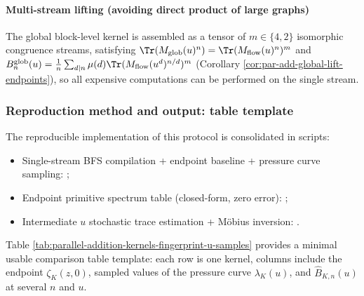 \paragraph{Multi-stream lifting (avoiding direct product of large graphs)}
The global block-level kernel is assembled as a tensor of $m\in\{4,2\}$ isomorphic congruence streams, satisfying
\(
\Tr(M_{\mathrm{glob}}(u)^n)=\Tr(M_{\mathrm{flow}}(u)^n)^m
\)
and
\(
B_n^{\mathrm{glob}}(u)=\frac1n\sum_{d\mid n}\mu(d)\Tr(M_{\mathrm{flow}}(u^d)^{n/d})^m
\)
(Corollary \ref{cor:par-add-global-lift-endpoints}), so all expensive computations can be performed on the single stream.
\subsubsection{Reproduction method and output: table template}
The reproducible implementation of this protocol is consolidated in scripts:
\begin{itemize}
  \item Single-stream BFS compilation + endpoint baseline + pressure curve sampling: ;
  \item Endpoint primitive spectrum table (closed-form, zero error): ;
  \item Intermediate $u$ stochastic trace estimation + M\"{o}bius inversion: .
\end{itemize}
Table \ref{tab:parallel-addition-kernels-fingerprint-u-samples} provides a minimal usable comparison table template: each row is one kernel, columns include the endpoint $\zeta_K(z,0)$, sampled values of the pressure curve $\lambda_K(u)$, and $\widehat B_{K,n}(u)$ at several $n$ and $u$.

